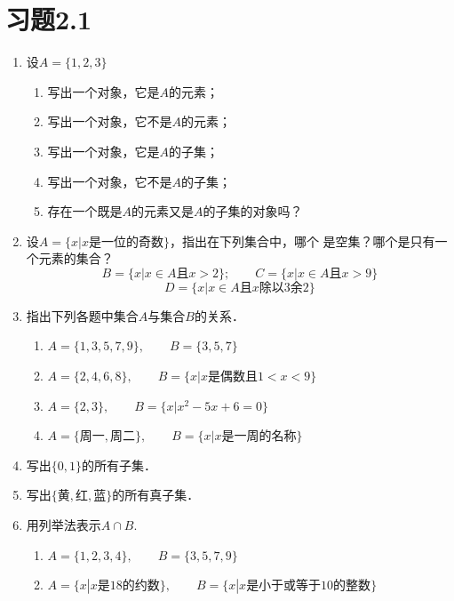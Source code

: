 \section*{习题2.1}
\begin{enumerate}
	\item 设$A=\{1, 2, 3\}$
	\begin{enumerate}
		\item 写出一个对象，它是$A$的元素；
		\item 写出一个对象，它不是$A$的元素；
		\item 写出一个对象，它是$A$的子集；
		\item 写出一个对象，它不是$A$的子集；
		\item 存在一个既是$A$的元素又是$A$的子集的对象吗？
	\end{enumerate}
	
	\item 设$A=\{x|x\text{是一位的奇数}\}$，指出在下列集合中，哪个
	是空集？哪个是只有一个元素的集合？
	\[B=\{x|x\in A\text{且}x>2\};\qquad C=\{x|x\in A\text{且}x>9\}\]
	\[D=\{x|x\in A\text{且}x\text{除以3余2}\}\]
	\item 指出下列各题中集合$A$与集合$B$的关系．
	\begin{enumerate}
		\item $A= \{1, 3, 5,7,9\},\qquad B=\{3,5,7\}$
		\item $A= \{2, 4, 6, 8\} ,\qquad B=\{x|x\text{是偶数且}1<x<9\}$
		\item $A= \{2, 3\} ,\qquad  B=\{x|x^2-5x+6=0\}$
		\item $A=\{\text{周一},\text{周二}\},\qquad B=\{x|x\text{是一周的名称}\}$
	\end{enumerate}
	
	\item 写出$\{0, 1\}$的所有子集．
	\item 写出$\{\text{黄},\text{红},\text{蓝}\}$的所有真子集．
	\item 用列举法表示$A\cap B$.
	\begin{enumerate}
		\item $A= \{1, 2, 3, 4\} ,\qquad B= \{3, 5, 7, 9\}$
		\item $A=\{x|x\text{是18的约数}\},\qquad B=\{x|x\text{是小于或等于10的整数}\}$
	\end{enumerate}
	

\end{enumerate}
